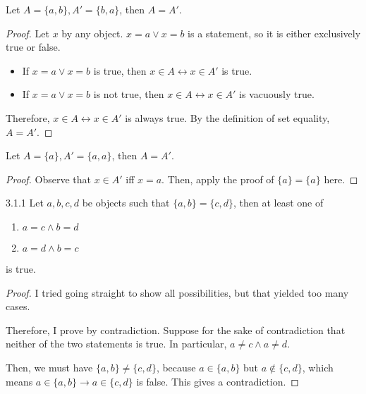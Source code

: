\begin{why}{30}\label{why.eq.pair.sets}
	Let $A = \{a,b\}, A' = \{b,a\}$, then $A = A'$.
\end{why}
\begin{proof}
	Let $x$ by any object. $x = a \vee x = b$ is a statement, so it is either exclusively true or false.
	
	\begin{itemize}
		\item If $x = a \vee x = b$ is true, then $x \in A \leftrightarrow x \in A'$ is true.
		\item If $x = a \vee x = b$ is not true, then $x \in A \leftrightarrow x \in A'$ is vacuously true.		
	\end{itemize}
	
	Therefore, $x \in A \leftrightarrow x \in A'$ is always true. By the definition of set equality, $A = A'$.
\end{proof}

\begin{why}{30}
	Let $A = \{a\}, A' = \{a,a\}$, then $A = A'$.
\end{why}
\begin{proof}
	Observe that $x \in A'$ iff $x = a$. Then, apply the proof of $\{a\} = \{a\}$ here.
\end{proof}

\begin{exercise}{3.1.1}
	Let $a,b,c,d$ be objects such that $\{a,b\} = \{c,d\}$, then at least one of
	\begin{enumerate}
		\item $a = c \wedge b = d$
		\item $a = d \wedge b = c$
	\end{enumerate}
	is true.
\end{exercise}
\begin{proof}
	I tried going straight to show all possibilities, but that yielded too many cases.
	
	Therefore, I prove by contradiction. Suppose for the sake of contradiction that neither of the two statements is true. In particular, $a \ne c \wedge a \ne d$.
	
	Then, we must have $\{a,b\} \ne \{c,d\}$, because $a \in \{a,b\}$ but $a \notin \{c, d\}$, which means $a \in \{a,b\} \to a \in \{c,d\}$ is false. This gives a contradiction.
\end{proof}

